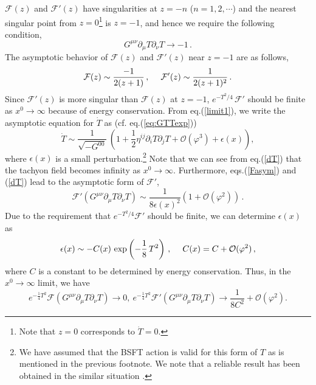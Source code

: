 \documentclass[12pt,a4paper]{article}
\newcommand{\p}{\partial}
\newcommand{\F}{\mathcal{F}}
\newcommand{\VT}{e^{-\frac{1}{4} T^2}}
\newcommand{\calO}{\mathcal{O}}
\begin{document}
$\F(z)$ and $\F'(z)$ have singularities at $z=-n$\quad
($n=1,2,\cdots$) and the nearest singular point from
$z=0$\footnote{Note that $z=0$ corresponds to $\dot{T}=0$.} is
$z=-1$, and hence we require the following condition,
\begin{equation}
 \label{limit1}
	G^{\mu\nu}\p_\mu T\p_\nu T\to -1\,.
\end{equation}
The asymptotic behavior of $\F(z)$ and $\F'(z)$
near $z=-1$ are as follows,
\begin{equation}
 \F(z) \sim \frac{-1}{2(z+1)}\,, \hspace{3ex}
	\F'(z) \sim \frac{1}{2(z+1)^2}\,.\label{Fasym}
\end{equation}
Since $\F'(z)$ is more singular than $\F(z)$ at $z=-1$,
$e^{-T^2/4}\,\F'$ should be finite as $x^0 \to \infty$ because of
energy conservation. From eq.(\ref{limit1}), we write the asymptotic
equation for $\dot{T}$ as (cf. eq.(\ref{eq:GTTexp}))
\begin{equation}
  \dot{T} \sim \frac{1}{\sqrt{-G^{00}}}\,\left(
	1 +\frac{1}{2}\eta^{ij}\p_i T \p_j T
	+ \calO(\varphi^3)+ \epsilon(x)\right), \label{dT}
\end{equation}
where $\epsilon(x)$ is a small perturbation.\footnote{We have assumed
that the BSFT action is valid for this form of $T$ as is mentioned in
the previous footnote. We note that a reliable result has been
obtained in the similar situation \cite{ST}.}
Note that we can see from eq.(\ref{dT}) that the tachyon field becomes
infinity as $x^0\to\infty$. Furthermore, eqs.(\ref{Fasym}) and
(\ref{dT}) lead to the asymptotic form of $\F'$,
\begin{equation}
 \F' \left( G^{\mu\nu}\p_\mu T\p_\nu T\right)
 \sim \frac{1}{8 \epsilon(x)^2} (1+\calO (\varphi^2))\, .
\end{equation}
Due to the requirement that $e^{-T^2/4}\F'$ should be
finite, we can determine $\epsilon(x)$ as
\begin{equation}
 \epsilon(x)\sim -C(x)\, \exp \left(-\frac{1}{8}\, T^2 \right) \,,
 \hspace{3ex} C(x)=C+\calO (\varphi^2)\,,
\end{equation}
where $C$ is a constant to be determined by energy conservation.
Thus, in the $x^0 \to \infty$ limit, we have
\begin{equation}
 \label{limit2}
 \VT \F \left(G^{\mu\nu}\p_\mu T\p_\nu T\right) \to 0,~
 \VT \F'\left(G^{\mu\nu}\p_\mu T\p_\nu T\right) \to
	\frac{1}{8 C^2}+\calO(\varphi^2).
\end{equation}
\end{document}
